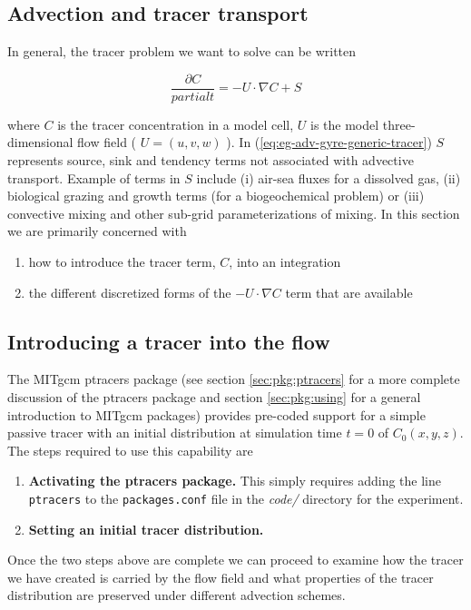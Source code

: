 \subsection{Advection and tracer transport}

In general, the tracer problem we want to solve can be written

\begin{equation}
\label{eq:eg-adv-gyre-generic-tracer}
\frac{\partial C}{partial t} = -U \cdot \nabla C + S
\end{equation}

where $C$ is the tracer concentration in a model cell, $U$ is the model three-dimensional
flow field ( $U=(u,v,w)$ ). In (\ref{eq:eg-adv-gyre-generic-tracer}) $S$ represents source, sink 
and tendency terms not associated with advective transport. Example of terms in $S$ include
(i) air-sea fluxes for a dissolved gas, (ii) biological grazing and growth terms (for a 
biogeochemical problem) or (iii) convective mixing and other sub-grid parameterizations of 
mixing. In this section we are primarily concerned with 
\begin{enumerate}
\item how to introduce the tracer term, $C$, into an integration
\item the different discretized forms of 
the $-U \cdot \nabla C$ term that are available
\end{enumerate}


\subsection{Introducing a tracer into the flow}

 The MITgcm ptracers package (see section \ref{sec:pkg:ptracers} for a more complete discussion
of the ptracers package and section \ref{sec:pkg:using} for a general introduction to MITgcm 
packages) provides pre-coded support for a simple passive tracer with an initial
distribution at simulation time $t=0$ of $C_0(x,y,z)$. The steps required to use this capability
are 
\begin{enumerate}
\item{\bf Activating the ptracers package.} This simply requires adding the line {\tt ptracers} to
the {\tt packages.conf} file in the {\it code/} directory for the experiment. 
\item{\bf Setting an initial tracer distribution.} 
\end{enumerate}

Once the two steps above are complete we can proceed to examine how the tracer we have created is
carried by the flow field and what properties of the tracer distribution are preserved under
different advection schemes.

